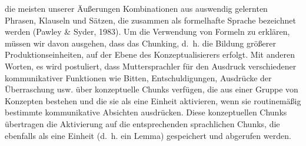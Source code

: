 \documentclass[
  letterpaper,
]{scrbook}
\begin{document}
die meisten unserer Äußerungen Kombinationen aus auswendig gelernten
Phrasen, Klauseln und Sätzen, die zusammen als formelhafte Sprache
bezeichnet werden (Pawley \& Syder, 1983). Um die Verwendung von Formeln
zu erklären, müssen wir davon ausgehen, dass das Chunking, d.~h. die
Bildung größerer Produktionseinheiten, auf der Ebene des
Konzeptualisierers erfolgt. Mit anderen Worten, es wird postuliert, dass
Muttersprachler für den Ausdruck verschiedener kommunikativer Funktionen
wie Bitten, Entschuldigungen, Ausdrücke der Überraschung usw. über
konzeptuelle Chunks verfügen, die aus einer Gruppe von Konzepten
bestehen und die sie als eine Einheit aktivieren, wenn sie routinemäßig
bestimmte kommunikative Absichten ausdrücken. Diese konzeptuellen Chunks
übertragen die Aktivierung auf die entsprechenden sprachlichen Chunks,
die ebenfalls als eine Einheit (d.~h. ein Lemma) gespeichert und
abgerufen werden.
\end{document}
